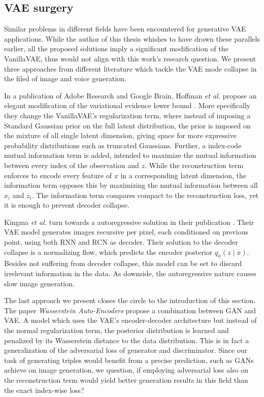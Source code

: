 \subsection{VAE surgery}
\label{ssec7:solutions}

Similar problems in different fields have been encountered for generative VAE applications. While the author of this thesis whishes to have drawn these parallels earlier, all the proposed solutions imply a significant modification of the VanillaVAE, thus would not align with this work's research question. We present three approaches from different literature which tackle the VAE mode collapse in the filed of image and voice generation.

In a publication of Adobe Research and Google Brain, Hoffman \textit{et al.} propose an elegant modification of the variational evidence lower bound \cite{hoffman2016elbo}. 
More specifically they change the VanillaVAE's regularization term, where instead of imposing a Standard Gaussian prior on the full latent distribution, the prior is imposed on the mixture of all single latent dimension, giving space for more expressive probability distributions such as truncated Gaussians. 
Further, a index-code mutual information term is added, intended to maximize the mutual information between every index of the observation and $z$. While the reconstruction term enforces to encode every feature of $x$ in a corresponding latent dimension, the  information term opposes this by maximizing the mutual information between all  $x_i$ and $z_i$. The information term compares compact to the reconstruction loss, yet it is enough to prevent decoder collapse. 


Kingma \textit{et al.} turn towards a autoregressive solution in their publication \cite{chen_variational_2017}. Their VAE model generates images recursive per pixel, each conditioned on previous point, using both RNN and RCN as decoder. Their solution to the decoder collapse is a normalizing flow, which predicts the encoder posterior $q_{\phi}(z \mid x)$. Besides not suffering from decoder collapse, this model can be set to discard irrelevant information in the data. As downside, the autoregressive nature causes slow image generation.


The last approach we present closes the circle to the introduction of this section. The paper \textit{Wasserstein Auto-Encoders} \cite{tolstikhin_wasserstein_2019} propose a combination between GAN and VAE. A model which uses the VAE's encoder-decoder architecture but instead of the normal regularization term, the posterior distribution is learned and penalized by its Wasserstein distance to the data distribution. This is in fact a generalization of the adversarial loss of generator and discriminator. Since our task of generating triples would benefit from a precise prediction, such as GANs achieve on image generation, we question, if employing adversarial loss also on the reconstruction term would yield better generation results in this field than the exact index-wise loss?

